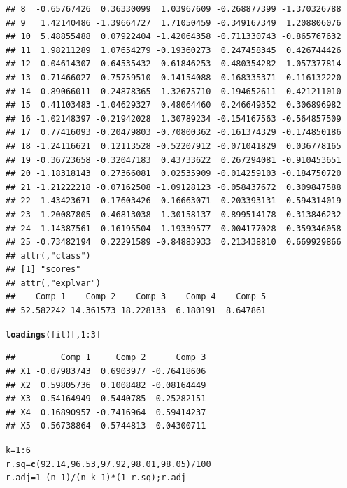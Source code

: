 \documentclass{article}\usepackage[]{graphicx}\usepackage[]{color}
\makeatletter
\newcommand{\hlnum}[1]{\textcolor[rgb]{0.686,0.059,0.569}{#1}}%
\newcommand{\hlopt}[1]{\textcolor[rgb]{0,0,0}{#1}}%
\newcommand{\hlstd}[1]{\textcolor[rgb]{0.345,0.345,0.345}{#1}}%
\newcommand{\hlkwb}[1]{\textcolor[rgb]{0.69,0.353,0.396}{#1}}%
\newcommand{\hlkwd}[1]{\textcolor[rgb]{0.737,0.353,0.396}{\textbf{#1}}}%
\newenvironment{kframe}{%
 \def\at@end@of@kframe{}%
 \ifinner\ifhmode%
  \def\at@end@of@kframe{\end{minipage}}%
  \begin{minipage}{\columnwidth}%
 \fi\fi%
 \def\FrameCommand##1{\hskip\@totalleftmargin \hskip-\fboxsep
 \colorbox{shadecolor}{##1}\hskip-\fboxsep
     \hskip-\linewidth \hskip-\@totalleftmargin \hskip\columnwidth}%
 \MakeFramed {\advance\hsize-\width
   \@totalleftmargin\z@ \linewidth\hsize
   \@setminipage}}%
 {\par\unskip\endMakeFramed%
 \at@end@of@kframe}
\newenvironment{knitrout}{}{} %
\makeatother
\begin{document}
\begin{enumerate}[(a)]
\begin{knitrout}
\begin{kframe}
\begin{verbatim}
## 8  -0.65767426  0.36330099  1.03967609 -0.268877399 -1.370326788
## 9   1.42140486 -1.39664727  1.71050459 -0.349167349  1.208806076
## 10  5.48855488  0.07922404 -1.42064358 -0.711330743 -0.865767632
## 11  1.98211289  1.07654279 -0.19360273  0.247458345  0.426744426
## 12  0.04614307 -0.64535432  0.61846253 -0.480354282  1.057377814
## 13 -0.71466027  0.75759510 -0.14154088 -0.168335371  0.116132220
## 14 -0.89066011 -0.24878365  1.32675710 -0.194652611 -0.421211010
## 15  0.41103483 -1.04629327  0.48064460  0.246649352  0.306896982
## 16 -1.02148397 -0.21942028  1.30789234 -0.154167563 -0.564857509
## 17  0.77416093 -0.20479803 -0.70800362 -0.161374329 -0.174850186
## 18 -1.24116621  0.12113528 -0.52207912 -0.071041829  0.036778165
## 19 -0.36723658 -0.32047183  0.43733622  0.267294081 -0.910453651
## 20 -1.18318143  0.27366081  0.02535909 -0.014259103 -0.184750720
## 21 -1.21222218 -0.07162508 -1.09128123 -0.058437672  0.309847588
## 22 -1.43423671  0.17603426  0.16663071 -0.203393131 -0.594314019
## 23  1.20087805  0.46813038  1.30158137  0.899514178 -0.313846232
## 24 -1.14387561 -0.16195504 -1.19339577 -0.004177028  0.359346058
## 25 -0.73482194  0.22291589 -0.84883933  0.213438810  0.669929866
## attr(,"class")
## [1] "scores"
## attr(,"explvar")
##    Comp 1    Comp 2    Comp 3    Comp 4    Comp 5 
## 52.582242 14.361573 18.228133  6.180191  8.647861
\end{verbatim}
\begin{alltt}
  \hlkwd{loadings}\hlstd{(fit)[,} \hlnum{1}\hlopt{:}\hlnum{3}\hlstd{]}
\end{alltt}
\begin{verbatim}
##         Comp 1     Comp 2      Comp 3
## X1 -0.07983743  0.6903977 -0.76418606
## X2  0.59805736  0.1008482 -0.08164449
## X3  0.54164949 -0.5440785 -0.25282151
## X4  0.16890957 -0.7416964  0.59414237
## X5  0.56738864  0.5744813  0.04300711
\end{verbatim}
\begin{alltt}
  \hlstd{k} \hlkwb{=} \hlnum{1}\hlopt{:}\hlnum{6}
  \hlstd{r.sq} \hlkwb{=} \hlkwd{c}\hlstd{(}\hlnum{92.14} \hlstd{,}   \hlnum{96.53}  \hlstd{,}  \hlnum{97.92}  \hlstd{,}  \hlnum{98.01} \hlstd{,}   \hlnum{98.05}\hlstd{)}\hlopt{/}\hlnum{100}
  \hlstd{r.adj} \hlkwb{=} \hlnum{1} \hlopt{-} \hlstd{(n}\hlopt{-}\hlnum{1}\hlstd{)}\hlopt{/}\hlstd{(n}\hlopt{-}\hlstd{k}\hlopt{-}\hlnum{1}\hlstd{)}\hlopt{*}\hlstd{(}\hlnum{1}\hlopt{-}\hlstd{r.sq); r.adj}
\end{alltt}



\end{kframe}
\end{knitrout}
\end{enumerate}
\end{document}
